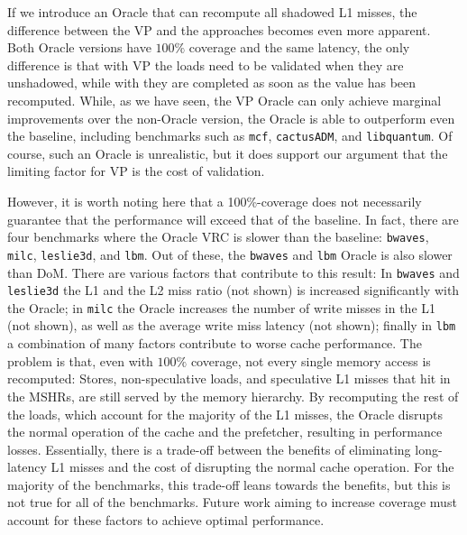 If we introduce an Oracle \recomp{} that can recompute all shadowed L1 misses, the difference between the VP and the \recomp{} approaches becomes even more apparent. 
Both Oracle versions have $100\%$ coverage and the same latency, the only difference is that with VP the loads need to be validated when they are unshadowed, while with \recomp{} they are completed as soon as the value has been recomputed.
While, as we have seen, the VP Oracle can only achieve marginal improvements over the non-Oracle version, the \recomp{} Oracle is able to outperform even the baseline, including benchmarks such as \texttt{mcf}, \texttt{cactusADM}, and \texttt{libquantum}.
Of course, such an Oracle is unrealistic, but it does support our argument that the limiting factor for VP is the cost of validation.


However, it is worth noting here that a 100\%-coverage {\recomp} does not necessarily guarantee that the performance will exceed that of the baseline. In fact, there are four benchmarks where the Oracle VRC is slower than the baseline: \texttt{bwaves}, \texttt{milc}, \texttt{leslie3d}, and \texttt{lbm}. Out of these, the \texttt{bwaves} and \texttt{lbm} {\recomp} Oracle is also slower than DoM.
There are various factors that contribute to this result: In \texttt{bwaves} and \texttt{leslie3d} the L1 and the L2 miss ratio (not shown) is increased significantly with the Oracle; in \texttt{milc} the Oracle increases the number of write misses in the L1 (not shown), as well as the average write miss latency (not shown); finally in \texttt{lbm} a combination of many factors contribute to worse cache performance.
The problem is that, even with $100\%$ coverage, not every single memory access is recomputed: Stores, non-speculative loads, and speculative L1 misses that hit in the MSHRs, are still served by the memory hierarchy. By recomputing the rest of the loads, which account for the majority of the L1 misses, the Oracle \recomp{} disrupts the normal operation of the cache and the prefetcher, resulting in performance losses. Essentially, there is a trade-off between the benefits of eliminating long-latency L1 misses and the cost of disrupting the normal cache operation.
For the majority of the benchmarks, this trade-off leans towards the benefits, but this is not true for all of the benchmarks.
Future work aiming to increase {\recomp} coverage must account for these factors to achieve optimal performance.



